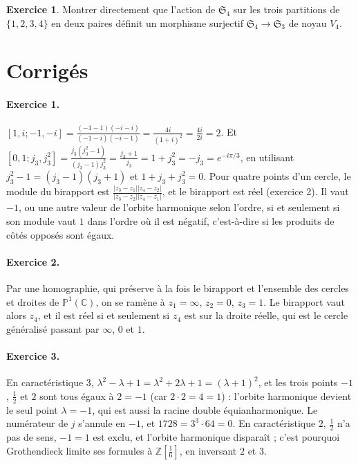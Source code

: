 \documentclass[11pt,a4paper]{article}
\theoremstyle{plain}
\theoremstyle{definition}
\newtheorem{exercice}{Exercice}
\theoremstyle{remark}
\newcommand{\C}{\mathbb{C}}
\newcommand{\Pu}{\mathbb{P}^1}
\newcommand{\Sym}{\mathfrak{S}}
\begin{document}
\begin{exercice}\label{exo:partitions}
Montrer directement que l'action de $\Sym_4$ sur les trois partitions de $\{1,2,3,4\}$ en deux paires définit un morphisme surjectif $\Sym_4\to\Sym_3$ de noyau $V_4$.
\end{exercice}

\section{Corrigés}

\paragraph{Exercice 1.} $[1,i;-1,-i]=\frac{(-1-1)(-i-i)}{(-1-i)(-i-1)}=\frac{4i}{(1+i)^2}=\frac{4i}{2i}=2$. Et $[0,1;j_3,j_3^2]=\frac{j_3(j_3^2-1)}{(j_3-1)j_3^2}=\frac{j_3+1}{j_3}=1+j_3^2=-j_3=e^{-i\pi/3}$, en utilisant $j_3^2-1=(j_3-1)(j_3+1)$ et $1+j_3+j_3^2=0$. Pour quatre points d'un cercle, le module du birapport est $\frac{|z_3-z_1||z_4-z_2|}{|z_3-z_2||z_4-z_1|}$, et le birapport est réel (exercice 2). Il vaut $-1$, ou une autre valeur de l'orbite harmonique selon l'ordre, si et seulement si son module vaut $1$ dans l'ordre où il est négatif, c'est-à-dire si les produits de côtés opposés sont égaux.

\paragraph{Exercice 2.} Par une homographie, qui préserve à la fois le birapport et l'ensemble des cercles et droites de $\Pu(\C)$, on se ramène à $z_1=\infty$, $z_2=0$, $z_3=1$. Le birapport vaut alors $z_4$, et il est réel si et seulement si $z_4$ est sur la droite réelle, qui est le cercle généralisé passant par $\infty$, $0$ et $1$.

\paragraph{Exercice 3.} En caractéristique $3$, $\lambda^2-\lambda+1=\lambda^2+2\lambda+1=(\lambda+1)^2$, et les trois points $-1$, $\frac12$ et $2$ sont tous égaux à $2=-1$ (car $2\cdot2=4=1$) : l'orbite harmonique devient le seul point $\lambda=-1$, qui est aussi la racine double équianharmonique. Le numérateur de $j$ s'annule en $-1$, et $1728=3^3\cdot64=0$. En caractéristique $2$, $\frac12$ n'a pas de sens, $-1=1$ est exclu, et l'orbite harmonique disparaît ; c'est pourquoi Grothendieck limite ses formules à $\mathbb Z[\frac16]$, en inversant $2$ et $3$.
\end{document}
